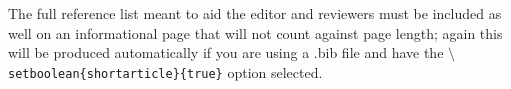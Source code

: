 \documentclass[9pt,twocolumn,twoside,pdftex]{optica}
\begin{document}
The full reference list meant to aid the editor and reviewers must be included as well on an informational page that will not count against page length; again this will be produced automatically if you are using a .bib file and have the \texttt{$\setminus$setboolean\{shortarticle\}\{true\}} option selected.





\end{document}
